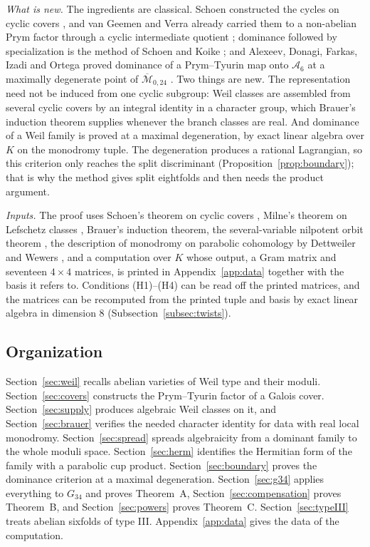 \documentclass[11pt]{amsart}
\theoremstyle{definition}
\theoremstyle{remark}
\begin{document}
\emph{What is new.} The ingredients are classical. Schoen constructed the cycles on cyclic covers \cite{Schoen88}, and van Geemen and Verra already carried them to a non-abelian Prym factor through a cyclic intermediate quotient \cite[Corollary~4.10]{vGV}; dominance followed by specialization is the method of Schoen and Koike \cite{Schoen98,Koike}; and Alexeev, Donagi, Farkas, Izadi and Ortega proved dominance of a Prym--Tyurin map onto $\mathcal A_6$ at a maximally degenerate point of $\overline{\mathcal M}_{0,24}$ \cite{ADFIO}. Two things are new. The representation need not be induced from one cyclic subgroup: Weil classes are assembled from several cyclic covers by an integral identity in a character group, which Brauer's induction theorem supplies whenever the branch classes are real. And dominance of a Weil family is proved at a maximal degeneration, by exact linear algebra over $K$ on the monodromy tuple. The degeneration produces a rational Lagrangian, so this criterion only reaches the split discriminant (Proposition~\ref{prop:boundary}); that is why the method gives split eightfolds and then needs the product argument.

\emph{Inputs.} The proof uses Schoen's theorem on cyclic covers \cite{Schoen88}, Milne's theorem on Lefschetz classes \cite{Milne}, Brauer's induction theorem, the several-variable nilpotent orbit theorem \cite{Schmid,CKS}, the description of monodromy on parabolic cohomology by Dettweiler and Wewers \cite{DW1}, and a computation over $K$ whose output, a Gram matrix and seventeen $4\times4$ matrices, is printed in Appendix~\ref{app:data} together with the basis it refers to. Conditions (H1)--(H4) can be read off the printed matrices, and the matrices can be recomputed from the printed tuple and basis by exact linear algebra in dimension $8$ (Subsection~\ref{subsec:twists}).

\subsection{Organization}
Section~\ref{sec:weil} recalls abelian varieties of Weil type and their moduli. Section~\ref{sec:covers} constructs the Prym--Tyurin factor of a Galois cover. Section~\ref{sec:supply} produces algebraic Weil classes on it, and Section~\ref{sec:brauer} verifies the needed character identity for data with real local monodromy. Section~\ref{sec:spread} spreads algebraicity from a dominant family to the whole moduli space. Section~\ref{sec:herm} identifies the Hermitian form of the family with a parabolic cup product. Section~\ref{sec:boundary} proves the dominance criterion at a maximal degeneration. Section~\ref{sec:g34} applies everything to $G_{34}$ and proves Theorem~A, Section~\ref{sec:compensation} proves Theorem~B, and Section~\ref{sec:powers} proves Theorem~C. Section~\ref{sec:typeIII} treats abelian sixfolds of type III. Appendix~\ref{app:data} gives the data of the computation.
\end{document}
